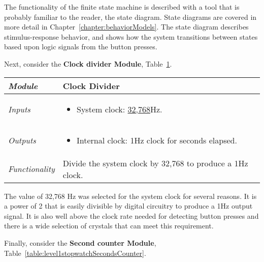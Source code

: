 The functionality of the finite state machine is described with a tool
that is probably familiar to the reader, the state diagram. State
diagrams are covered in more detail in
 Chapter~\ref{chapter:behaviorModels}. The state diagram
describes stimulus-response behavior, and shows how the system
transitions between states based upon logic signals from the button
presses.

Next, consider 
the \textbf{Clock divider Module}, Table~\ref{table:stopwatchClockDivider}.

\begin{table}[h]
\label{table:stopwatchClockDivider}
\begin{tabular}{|l|m{10cm}|}
\hline
\emph{Module} & Clock Divider\\ \hline
\emph{Inputs} & 
\begin{itemize}
\item
  System clock: \ul{32,768}Hz.
\end{itemize}\\ \hline

\emph{Outputs} & 
\begin{itemize}
\item
  Internal clock: 1Hz clock for seconds elapsed.
\end{itemize} \\ \hline
\emph{Functionality} & Divide the system clock by 32,768 to produce a
1Hz clock. \\ \hline
\end{tabular}
\end{table}

The value of 32,768 Hz was selected for the system clock for several
reasons. It is a power of 2 that is easily divisible by digital
circuitry to produce a 1Hz output signal. It is also well above the
clock rate needed for detecting button presses and there is a wide
selection of crystals that can meet this requirement.

Finally, consider 
the \textbf{Second counter Module}, Table~\ref{table:level1stopwatchSecondsCounter}.

